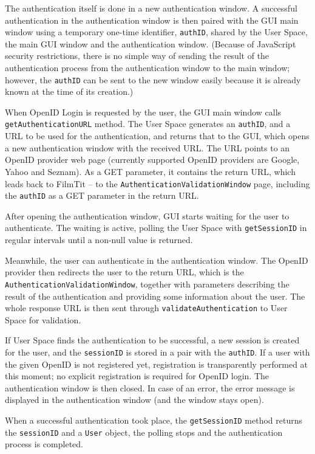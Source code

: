 {The authentication itself is done in a new authentication window.
A successful authentication in the authentication window is then paired with the GUI main window using a temporary one-time identifier, {\tt authID}, shared by the User Space, the main GUI window and the authentication window.
(Because of JavaScript security restrictions, there is no simple way of sending the result of the authentication process from the authentication window to the main window;
however, the {\tt authID} can be sent to the new window easily because it is already known at the time of its creation.)

When OpenID Login is requested by the user, the GUI main window calls {\tt getAuthenticationURL} method.
The User Space generates an {\tt authID}, and a URL to be used for the authentication, and returns that to the GUI, which opens a new authentication window with the received URL.
The URL points to an OpenID provider web page (currently supported OpenID providers are Google, Yahoo and Seznam). As a GET parameter, it contains the return URL, which leads back to FilmTit -- to the {\tt AuthenticationValidationWindow} page, including the {\tt authID} as a GET parameter in the return URL.

After opening the authentication window, GUI starts waiting for the user to authenticate. The waiting is active, polling the User Space with {\tt getSessionID} in regular intervals until a non-null value is returned.

Meanwhile, the user can authenticate in the authentication window. The OpenID provider then redirects the user to the return URL, which is the {\tt AuthenticationValidationWindow}, together with parameters describing the result of the authentication and providing some information about the user.
The whole response URL is then sent through {\tt validateAuthentication} to User Space for validation.

If User Space finds the authentication to be successful, a new session is created for the user, and the {\tt sessionID} is stored in a pair with the {\tt authID}.
If a user with the given OpenID is not registered yet, registration is transparently performed at this moment; no explicit registration is required for OpenID login.
The authentication window is then closed.
In case of an error, the error message is displayed in the authentication window (and the window stays open).

When a successful authentication took place, the {\tt getSessionID} method returns the {\tt sessionID} and a {\tt User} object, the polling stops and the authentication process is completed.

}
